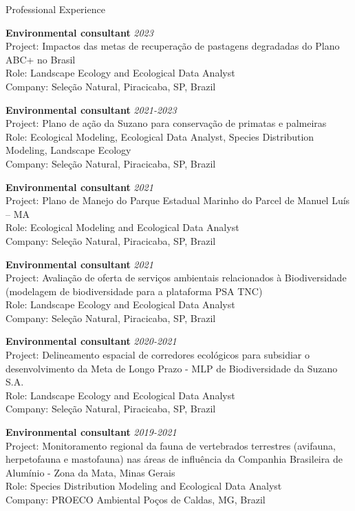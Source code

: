 \documentclass{resume}
\begin{document}

\begin{rSection}{Professional Experience}

{\bf Environmental consultant} \hfill{\em 2023} \\ 
Project: Impactos das metas de recuperação de pastagens degradadas do Plano ABC+ no Brasil \\ 
Role: Landscape Ecology and Ecological Data Analyst \\ 
Company: Seleção Natural, Piracicaba, SP, Brazil

{\bf Environmental consultant} \hfill{\em 2021-2023} \\ 
Project: Plano de ação da Suzano para conservação de primatas e palmeiras \\ 
Role: Ecological Modeling, Ecological Data Analyst, Species Distribution Modeling, Landscape Ecology \\ 
Company: Seleção Natural, Piracicaba, SP, Brazil

{\bf Environmental consultant} \hfill{\em 2021} \\ 
Project: Plano de Manejo do Parque Estadual Marinho do Parcel de Manuel Luís – MA \\ 
Role: Ecological Modeling and Ecological Data Analyst\\ 
Company: Seleção Natural, Piracicaba, SP, Brazil

{\bf Environmental consultant} \hfill{\em 2021} \\ 
Project: Avaliação de oferta de serviços ambientais relacionados à Biodiversidade (modelagem de biodiversidade para a plataforma PSA TNC) \\ 
Role: Landscape Ecology and Ecological Data Analyst \\ 
Company: Seleção Natural, Piracicaba, SP, Brazil

{\bf Environmental consultant} \hfill{\em 2020-2021} \\ 
Project: Delineamento espacial de corredores ecológicos para subsidiar o desenvolvimento da Meta de Longo Prazo - MLP de Biodiversidade da Suzano S.A. \\ 
Role: Landscape Ecology and Ecological Data Analyst \\ 
Company: Seleção Natural, Piracicaba, SP, Brazil

{\bf Environmental consultant} \hfill{\em 2019-2021} \\ 
Project: Monitoramento regional da fauna de vertebrados terrestres (avifauna, herpetofauna e mastofauna) nas áreas de influência da Companhia Brasileira de Alumínio - Zona da Mata, Minas Gerais \\ 
Role: Species Distribution Modeling and Ecological Data Analyst \\ 
Company: PROECO Ambiental Poços de Caldas, MG, Brazil


\end{rSection}
\end{document}
